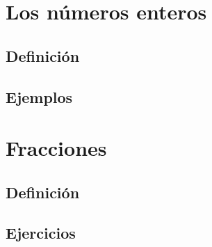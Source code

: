 \documentclass{article}
\begin{document}
\tableofcontents

    \section*{Los números enteros}
      \lipsum[1]
      \subsection*{Definición}
      \lipsum[1]
      \subsection*{Ejemplos}
      \lipsum[1]
    \section{Fracciones}
      \subsection{Definición}
      \lipsum[1]
      \subsection{Ejercicios}
      \lipsum[1]
\end{document}
